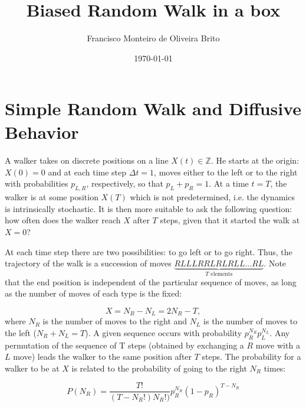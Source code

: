 \documentclass[10pt]{article}
\begin{document}
\title{Biased Random Walk in a box}
\author{Francisco Monteiro de Oliveira Brito}
\date{\today}
\maketitle

\begin{abstract}

\end{abstract}

\section{Simple Random Walk and Diffusive Behavior}\paragraph{}

A walker takes on discrete positions on a line $X(t) \in \mathbb{Z}$. He starts at the origin: $X(0) = 0$ and at each time step $\Delta t = 1$, moves either to the left or to the right with probabilities $p_{L,R}$, respectively, so that $p_L + p_R = 1$. At a time $t = T$, the walker is at some position $X(T)$ which is not predetermined, i.e. the dynamics is intrinsically stochastic. It is then more suitable to ask the following question: how often does the walker reach $X$ after $T$ steps, given that it started the walk at $X = 0$?

At each time step there are two possibilities: to go left or to go right. Thus, the trajectory of the walk is a succession of moves $\underbrace{RLLLRRLRLRLL...RL}_{T \text{ elements}}$. Note that the end position is independent of the particular sequence of moves, as long as the number of moves of each type is the fixed:

\begin{equation}\label{eq:x}
X = N_R - N_L = 2 N_R - T ,
\end{equation}
where $N_R$ is the number of moves to the right and $N_L$ is the number of moves to the left ($N_R + N_L = T$). A given sequence occurs with probability $p_R^{N_R} p_L^{N_L}$. Any permutation of the sequence of T steps (obtained by exchanging a $R$ move with a $L$ move) leads the walker to the same position after $T$ steps. The probability for a walker to be at $X$ is related to the probability of going to the right $N_R$ times:

\begin{equation}
P(N_R) = \frac{T!}{(T - N_R !) N_R !)} p_R^{N_R} (1 - p_R)^{T - N_R}
\end{equation}
\end{document}
